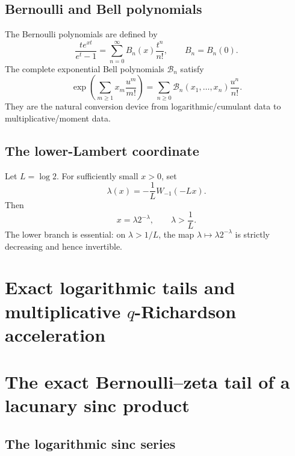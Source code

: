 \documentclass[11pt]{article}
\numberwithin{equation}{section}
\theoremstyle{definition}
\theoremstyle{remark}
\begin{document}
\subsection{Bernoulli and Bell polynomials}

The Bernoulli polynomials are defined by
\begin{equation}
\frac{te^{xt}}{e^t-1}=\sum_{n=0}^{\infty}B_n(x)\frac{t^n}{n!},
\qquad B_n=B_n(0).
\label{p8:eq:bernoulli-gen}
\end{equation}
The complete exponential Bell polynomials $\mathcal B_n$ satisfy
\begin{equation}
\exp\!\left(\sum_{m\ge1}x_m\frac{u^m}{m!}\right)
=\sum_{n\ge0}\mathcal B_n(x_1,\ldots,x_n)\frac{u^n}{n!}.
\label{p8:eq:bell-gen}
\end{equation}
They are the natural conversion device from logarithmic/cumulant data to multiplicative/moment data.

\subsection{The lower-Lambert coordinate}

Let $L=\log 2$. For sufficiently small $x>0$, set
\begin{equation}
\lambda(x)=-\frac{1}{L}W_{-1}(-Lx).
\label{p8:eq:lambda-def}
\end{equation}
Then
\begin{equation}
x=\lambda 2^{-\lambda},\qquad \lambda>\frac1L.
\label{p8:eq:lambda-inverse}
\end{equation}
The lower branch is essential: on $\lambda>1/L$, the map $\lambda\mapsto\lambda2^{-\lambda}$ is strictly decreasing and hence invertible.

\section{Exact logarithmic tails and multiplicative \texorpdfstring{$q$}{q}-Richardson acceleration}

\section{The exact Bernoulli--zeta tail of a lacunary sinc product}
\label{p8:sec:tail}

\subsection{The logarithmic sinc series}
\end{document}
